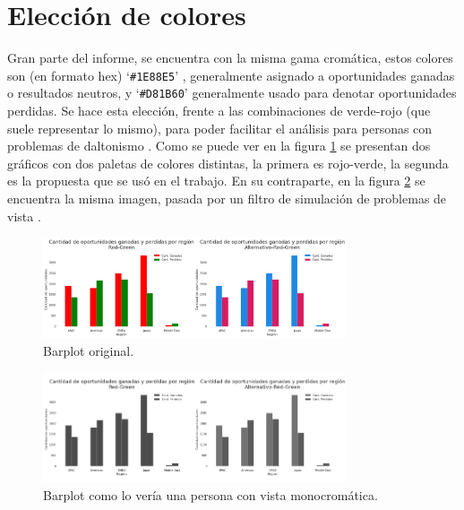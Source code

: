 \documentclass[titlepage,a4paper]{article}
\begin{document}
\section{Elección de colores}
Gran parte del informe, se encuentra con la misma gama cromática, estos colores son (en formato hex) `\verb|#1E88E5|' , generalmente asignado a oportunidades ganadas o resultados neutros, y `\verb|#D81B60|'  generalmente usado para denotar oportunidades perdidas. Se hace esta elección, frente a las combinaciones de verde-rojo (que suele representar lo mismo), para poder facilitar el análisis para personas con problemas de daltonismo \cite{color_blind_visu}. Como se puede ver en la figura \ref{fig:bp_colores} se presentan dos gráficos con dos paletas de colores distintas, la primera es rojo-verde, la segunda es la propuesta que se usó en el trabajo. En su contraparte, en la figura \ref{fig:bp_colores_converted} se encuentra la misma imagen, pasada por un filtro de simulación de problemas de vista \cite{simulador_problemas_visuales}.

\begin{figure}[H]
\centering
\includegraphics[width=0.8\textwidth]{images/bp_colores.png}
\cprotect\caption{\label{fig:bp_colores} Barplot original.}
\end{figure}

\begin{figure}[H]
\centering
\includegraphics[width=0.8\textwidth]{images/bp_colores_converted.png}
\cprotect\caption{\label{fig:bp_colores_converted} Barplot como lo vería una persona con vista monocromática. }
\end{figure}
\end{document}
